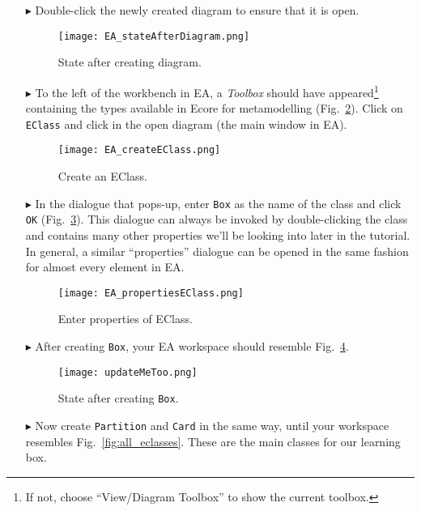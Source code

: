 \begin{enumerate}
\item[$\blacktriangleright$] Double-click the newly created diagram to ensure that it is open.

\begin{figure}[htbp]
	\centering
  \texttt{[image: EA\_stateAfterDiagram.png]}
	\caption{State after creating diagram.}
	\label{fig:diagram_completed}
\end{figure}

\item[$\blacktriangleright$] To the left of the workbench in EA, a \emph{Toolbox} should have appeared\footnote{If not, choose ``View/Diagram Toolbox'' to show the current toolbox.} containing the types available in Ecore for metamodelling (Fig.~\ref{fig:eclass}).
Click on \texttt{EClass} and click in the open diagram (the main window in EA).

\begin{figure}[htbp]
	\centering
  \texttt{[image: EA\_createEClass.png]}
	\caption{Create an EClass.}
	\label{fig:eclass}
\end{figure}


\item[$\blacktriangleright$] In the dialogue that pops-up, enter \texttt{Box} as the name of the class and click \texttt{OK} (Fig.~\ref{fig:eclass_properties}).
This dialogue can always be invoked by double-clicking the class and contains many other properties we'll be looking into later in the tutorial.
In general, a similar ``properties'' dialogue can be opened in the same fashion for almost every element in EA.

\begin{figure}[htbp]
	\centering
  \texttt{[image: EA\_propertiesEClass.png]}
	\caption{Enter properties of EClass.}
	\label{fig:eclass_properties}
\end{figure}

\item[$\blacktriangleright$] After creating \texttt{Box}, your EA workspace should resemble Fig.~\ref{fig:eclass_completed}.

\begin{figure}[htbp]
	\centering
  \texttt{[image: updateMeToo.png]}
	\caption{State after creating \texttt{Box}.}
	\label{fig:eclass_completed}
\end{figure}


\item[$\blacktriangleright$] Now create \texttt{Partition} and \texttt{Card} in the same way, until your workspace resembles Fig.~\ref{fig:all_eclasses}.
These are the main classes for our learning box.


\end{enumerate}
